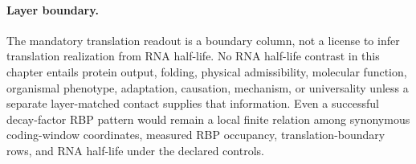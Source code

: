 \paragraph{Layer boundary.}
The mandatory translation readout is a boundary column, not a license to infer translation realization from RNA half-life.  No RNA half-life contrast in this chapter entails protein output, folding, physical admissibility, molecular function, organismal phenotype, adaptation, causation, mechanism, or universality unless a separate layer-matched contact supplies that information.  Even a successful decay-factor RBP pattern would remain a local finite relation among synonymous coding-window coordinates, measured RBP occupancy, translation-boundary rows, and RNA half-life under the declared controls.
